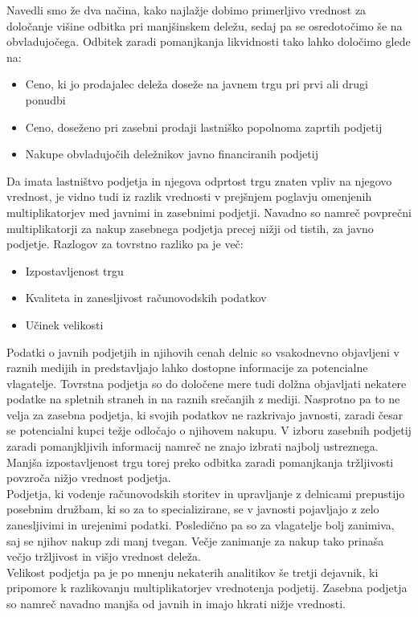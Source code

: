\documentclass[12pt,a4paper]{amsart}
\theoremstyle{definition} %
\theoremstyle{plain} %
\begin{document}
Navedli smo že dva načina, kako najlažje dobimo primerljivo vrednost za določanje višine odbitka pri manjšinskem deležu, sedaj pa se osredotočimo še na obvladujočega. Odbitek zaradi pomanjkanja likvidnosti tako lahko določimo glede na:
\begin{itemize}
\item Ceno, ki jo prodajalec deleža doseže na javnem trgu pri prvi ali drugi ponudbi 
\item Ceno, doseženo pri zasebni prodaji lastniško popolnoma zaprtih podjetij
\item Nakupe obvladujočih deležnikov javno financiranih podjetij
\end{itemize}

Da imata lastništvo podjetja in njegova odprtost trgu znaten vpliv na njegovo vrednost, je vidno tudi iz razlik vrednosti v prejšnjem poglavju omenjenih multiplikatorjev med javnimi in zasebnimi podjetji. Navadno so namreč povprečni multiplikatorji za nakup zasebnega podjetja precej nižji od tistih, za javno podjetje. Razlogov za tovrstno razliko pa je več:
\begin{itemize}
\item Izpostavljenost trgu
\item Kvaliteta in zanesljivost računovodskih podatkov 
\item Učinek velikosti
\end{itemize}
Podatki o javnih podjetjih in njihovih cenah delnic so vsakodnevno objavljeni v raznih medijih in predstavljajo lahko dostopne informacije za potencialne vlagatelje. Tovrstna podjetja so do določene mere tudi dolžna objavljati nekatere podatke na spletnih straneh in na raznih srečanjih z mediji. Nasprotno pa to ne velja za zasebna podjetja, ki svojih podatkov ne razkrivajo javnosti, zaradi česar se potencialni kupci težje odločajo o njihovem nakupu. V izboru zasebnih podjetij zaradi pomanjkljivih informacij namreč ne znajo izbrati najbolj ustreznega. Manjša izpostavljenost trgu torej preko odbitka zaradi pomanjkanja tržljivosti povzroča nižjo vrednost podjetja.\\
Podjetja, ki vodenje računovodskih storitev in upravljanje z delnicami prepustijo posebnim družbam, ki so za to specializirane, se v javnosti pojavljajo z zelo zanesljivimi in urejenimi podatki. Posledično pa so za vlagatelje bolj zanimiva, saj se njihov nakup zdi manj tvegan. Večje zanimanje za nakup tako prinaša večjo tržljivost in višjo vrednost deleža.\\
Velikost podjetja pa je po mnenju nekaterih analitikov še tretji dejavnik, ki pripomore k razlikovanju multiplikatorjev vrednotenja podjetij. Zasebna podjetja so namreč navadno manjša od javnih in imajo hkrati nižje vrednosti. \\
\end{document}
